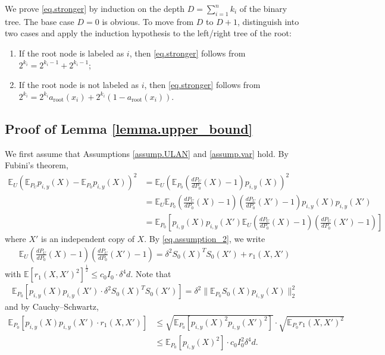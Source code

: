 \documentclass[final,12pt]{colt2018} %
\def \bE {\mathbb{E}}
\begin{document}
We prove \eqref{eq.stronger} by induction on the depth $D=\sum_{i=1}^n k_i$ of the binary tree. The base case $D=0$ is obvious. To move from $D$ to $D+1$, distinguish into two cases and apply the induction hypothesis to the left/right tree of the root: 
\begin{enumerate}
	\item If the root node is labeled as $i$, then \eqref{eq.stronger} follows from $2^{k_i}=2^{k_i-1}+2^{k_i-1}$; 
	\item If the root node is not labeled as $i$, then \eqref{eq.stronger} follows from $2^{k_i} = 2^{k_i}a_{\text{root}}(x_i) + 2^{k_i}(1-a_{\text{root}}(x_i))$. 
\end{enumerate}

\subsection{Proof of Lemma \ref{lemma.upper_bound}}
We first assume that Assumptions \ref{assump.ULAN} and \ref{assump.var} hold. By Fubini's theorem, 
\begin{align*}
\bE_U (\bE_{P_U} p_{i,y}(X) - \bE_{P_0} p_{i,y}(X))^2 &= \bE_U \left(\bE_{P_0} \left(\frac{dP_U}{dP_0}(X) - 1\right)p_{i,y}(X) \right)^2 \\
&= \bE_U \bE_{P_0} \left(\frac{dP_U}{dP_0}(X) - 1\right)\left(\frac{dP_U}{dP_0}(X') - 1\right)p_{i,y}(X)p_{i,y}(X') \\
&= \bE_{P_0} \left[ p_{i,y}(X)p_{i,y}(X') \bE_U \left(\frac{dP_U}{dP_0}(X) - 1\right)\left(\frac{dP_U}{dP_0}(X') - 1\right) \right]
\end{align*}
where $X'$ is an independent copy of $X$. By \eqref{eq.assumption_2}, we write
\begin{align*}
\bE_U \left(\frac{dP_U}{dP_0}(X) - 1\right)\left(\frac{dP_U}{dP_0}(X') - 1\right) = \delta^2 S_0(X)^TS_0(X') + r_1(X,X')
\end{align*}
with $\bE[r_1(X,X')^2]^{\frac{1}{2}}\le c_0I_0\cdot \delta^4d$. Note that 
\begin{align}\label{eq.fubini_1}
\bE_{P_0} \left[ p_{i,y}(X)p_{i,y}(X')\cdot \delta^2 S_0(X)^TS_0(X')\right] = \delta^2 \|\bE_{P_0}S_0(X)p_{i,y}(X) \|_2^2
\end{align}
and by Cauchy--Schwartz, 
\begin{align*}
\bE_{P_0} \left[ p_{i,y}(X)p_{i,y}(X')\cdot r_1(X,X')\right] &\le \sqrt{ \bE_{P_0}[p_{i,y}(X)^2p_{i,y}(X')^2] }\cdot \sqrt{\bE_{P_0} r_1(X,X')^2} \\
&\le \bE_{P_0}[p_{i,y}(X)^2] \cdot c_0 I_0^2\delta^4 d. 
\end{align*}
\end{document}
